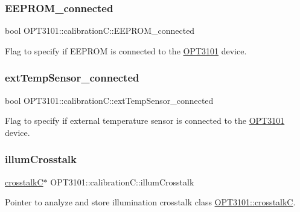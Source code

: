 \subsubsection{\texorpdfstring{E\+E\+P\+R\+O\+M\+\_\+connected}{EEPROM\_connected}}
{\footnotesize\ttfamily bool O\+P\+T3101\+::calibration\+C\+::\+E\+E\+P\+R\+O\+M\+\_\+connected}



Flag to specify if E\+E\+P\+R\+OM is connected to the \mbox{\hyperlink{namespace_o_p_t3101}{O\+P\+T3101}} device. 

\mbox{\label{class_o_p_t3101_1_1calibration_c_a703a4667679ca3cfd19801908cdbf153}} 
\subsubsection{\texorpdfstring{ext\+Temp\+Sensor\+\_\+connected}{extTempSensor\_connected}}
{\footnotesize\ttfamily bool O\+P\+T3101\+::calibration\+C\+::ext\+Temp\+Sensor\+\_\+connected}



Flag to specify if external temperature sensor is connected to the \mbox{\hyperlink{namespace_o_p_t3101}{O\+P\+T3101}} device. 

\mbox{\label{class_o_p_t3101_1_1calibration_c_ac09121c7057093506de63d6e2ea3a4b7}} 
\subsubsection{\texorpdfstring{illum\+Crosstalk}{illumCrosstalk}}
{\footnotesize\ttfamily \mbox{\hyperlink{class_o_p_t3101_1_1crosstalk_c}{crosstalkC}}$\ast$ O\+P\+T3101\+::calibration\+C\+::illum\+Crosstalk}



Pointer to analyze and store illumination crosstalk class \mbox{\hyperlink{class_o_p_t3101_1_1crosstalk_c}{O\+P\+T3101\+::crosstalkC}}. 

